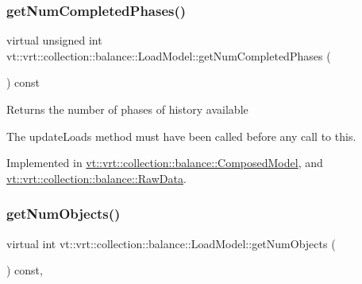 \mbox{\label{structvt_1_1vrt_1_1collection_1_1balance_1_1_load_model_abba98976118ff797fc2393a50e3e80d8}} 
\subsubsection{\texorpdfstring{get\+Num\+Completed\+Phases()}{getNumCompletedPhases()}}
{\footnotesize\ttfamily virtual unsigned int vt\+::vrt\+::collection\+::balance\+::\+Load\+Model\+::get\+Num\+Completed\+Phases (\begin{DoxyParamCaption}{ }\end{DoxyParamCaption}) const\hspace{0.3cm}{\ttfamily [pure virtual]}}

Returns the number of phases of history available

The {\ttfamily update\+Loads} method must have been called before any call to this. 

Implemented in \hyperlink{classvt_1_1vrt_1_1collection_1_1balance_1_1_composed_model_a85bd890eb6e94c85cbfeb9ef321139dc}{vt\+::vrt\+::collection\+::balance\+::\+Composed\+Model}, and \hyperlink{structvt_1_1vrt_1_1collection_1_1balance_1_1_raw_data_afc5ca3584a08924a4c5941b32aebb35e}{vt\+::vrt\+::collection\+::balance\+::\+Raw\+Data}.

\mbox{\label{structvt_1_1vrt_1_1collection_1_1balance_1_1_load_model_a438cd95f1c60b4232152335c4ee950bc}} 
\subsubsection{\texorpdfstring{get\+Num\+Objects()}{getNumObjects()}}
{\footnotesize\ttfamily virtual int vt\+::vrt\+::collection\+::balance\+::\+Load\+Model\+::get\+Num\+Objects (\begin{DoxyParamCaption}{ }\end{DoxyParamCaption}) const\hspace{0.3cm}{\ttfamily [inline]}, {\ttfamily [virtual]}}

